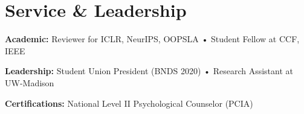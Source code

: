 \documentclass[11pt,letterpaper]{article}
\begin{document}
\section{Service \& Leadership}
\begin{itemize}[leftmargin=0.15in, label={}]
  \small{
    \item \textbf{Academic:} Reviewer for ICLR, NeurIPS, OOPSLA • Student Fellow at CCF, IEEE
    \item \textbf{Leadership:} Student Union President (BNDS 2020) • Research Assistant at UW-Madison
    \item \textbf{Certifications:} National Level II Psychological Counselor (PCIA)
  }
\end{itemize}
\end{document}

